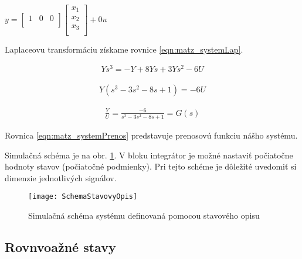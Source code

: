 \documentclass[../main.tex]{subfiles}
\begin{document}
        \begin{center}
		$y  = 
		\begin{bmatrix} 
			1 & 0 & 0 \\ 
		\end{bmatrix} 
		\begin{bmatrix} 
			x_1 \\ 
			x_2 \\ 
			x_3 \\ 
		\end{bmatrix} +
		0u $
	\label{eqn:matz_system2}
        \end{center}

Laplaceovu transformáciu získame rovnice \ref{eqn:matz_systemLap}. 

\begin{equation}
	\begin{split}
		Ys^3 = -Y + 8 Ys + 3Ys^2 - 6U
	\end{split}
	\label{eqn:matz_systemLap}
\end{equation}

\begin{equation}
	\begin{split}
		Y(s^3 -3s^2 -8s + 1) = - 6U
	\end{split}
\end{equation}

\begin{equation}
	\begin{split}
		\frac{Y}{U} = \frac{-6}{s^3 -3s^2 -8s + 1} = G(s)
	\end{split}
	\label{eqn:matz_systemPrenos}
\end{equation}

Rovnica  \ref{eqn:matz_systemPrenos} predstavuje prenosovú funkciu nášho systému.

Simulačná schéma je na obr. \ref{fig:matz_systemStavovyOpisSimulink}. V bloku integrátor je možné nastaviť počiatočne hodnoty stavov (počiatočné podmienky). Pri tejto schéme je dôležité uvedomiť si dimenzie jednotlivých signálov.

\begin{figure}[h!]
	\centering
	\texttt{[image: SchemaStavovyOpis]}
	\caption{Simulačná schéma systému definovaná pomocou stavového opisu}
	\label{fig:matz_systemStavovyOpisSimulink}
\end{figure}

\subsection{Rovnvoažné stavy}
	
\end{document}
